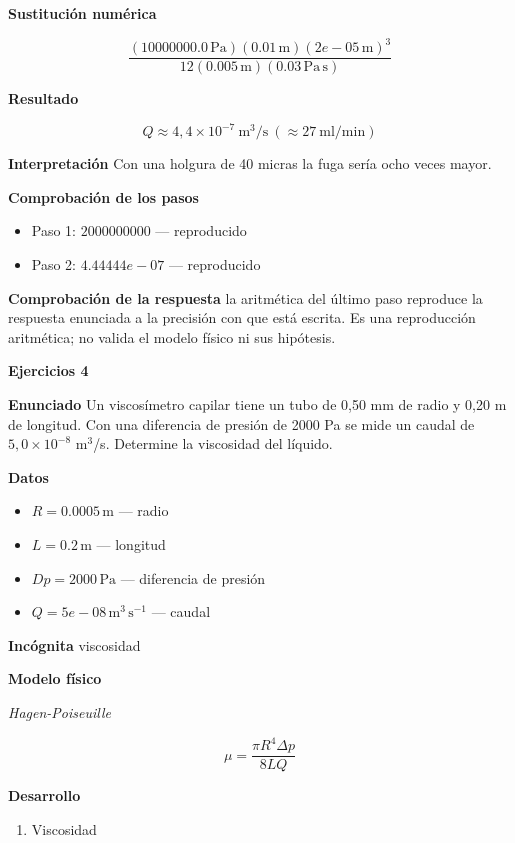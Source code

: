 \documentclass[10pt,openany]{book}
\begin{document}
\noindent\textbf{Sustitución numérica}

\[
\frac{\left(10000000.0\,\mathrm{Pa}\right) \left(0.01\,\mathrm{m}\right) \left(2e-05\,\mathrm{m}\right)^{3}}{12 \left(0.005\,\mathrm{m}\right) \left(0.03\,\mathrm{Pa}\,\mathrm{s}\right)}
\]

\noindent\textbf{Resultado}

\[
Q \approx 4{,}4\times 10^{-7}\ \mathrm{m^{3}/s}\ (\approx 27\ \mathrm{ml/min})
\]

\noindent\textbf{Interpretación}
Con una holgura de 40 micras la fuga sería ocho veces mayor.

\noindent\textbf{Comprobación de los pasos}
\begin{itemize}
\item Paso 1: $2000000000$ — reproducido
\item Paso 2: $4.44444e-07$ — reproducido
\end{itemize}

\noindent\textbf{Comprobación de la respuesta} la aritmética del último paso reproduce la respuesta enunciada a la precisión con que está escrita. Es una reproducción aritmética; no valida el modelo físico ni sus hipótesis.

\noindent\textbf{Ejercicios 4}

\noindent\textbf{Enunciado}
Un viscosímetro capilar tiene un tubo de 0,50 mm de radio y 0,20 m de longitud. Con una diferencia de presión de 2000 Pa se mide un caudal de \(5{,}0\times 10^{-8}\) m\(^3\)/s. Determine la viscosidad del líquido.

\noindent\textbf{Datos}
\begin{itemize}
\item $R = 0.0005\,\mathrm{m}$ — radio
\item $L = 0.2\,\mathrm{m}$ — longitud
\item $Dp = 2000\,\mathrm{Pa}$ — diferencia de presión
\item $Q = 5e-08\,\mathrm{m}^{3}\,\mathrm{s}^{-1}$ — caudal
\end{itemize}

\noindent\textbf{Incógnita}
viscosidad

\noindent\textbf{Modelo físico}

\noindent\textit{Hagen-Poiseuille}

\[
\mu = \frac{\pi R^{4}\Delta p}{8 L Q}
\]

\noindent\textbf{Desarrollo}
\begin{enumerate}
\item
Viscosidad
\end{enumerate}
\end{document}
